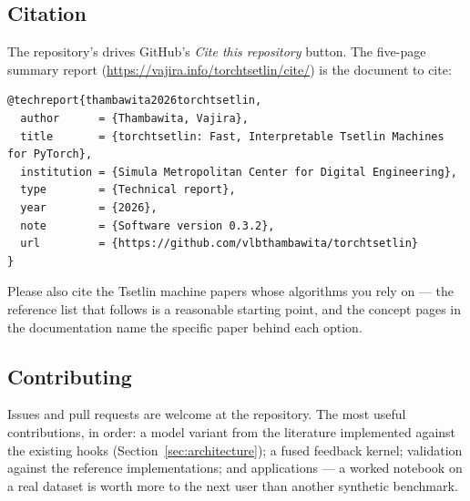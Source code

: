 \subsection{Citation}

The repository's  drives GitHub's \emph{Cite this repository} button. The
five-page summary report (\url{https://vajira.info/torchtsetlin/cite/}) is the document to cite:

\begin{lstlisting}[style=ttshell,basicstyle=\ttfamily\scriptsize\color{ttink}]
@techreport{thambawita2026torchtsetlin,
  author      = {Thambawita, Vajira},
  title       = {torchtsetlin: Fast, Interpretable Tsetlin Machines for PyTorch},
  institution = {Simula Metropolitan Center for Digital Engineering},
  type        = {Technical report},
  year        = {2026},
  note        = {Software version 0.3.2},
  url         = {https://github.com/vlbthambawita/torchtsetlin}
}
\end{lstlisting}

Please also cite the Tsetlin machine papers whose algorithms you rely on --- the reference
list that follows is a reasonable starting point, and the concept pages in the documentation
name the specific paper behind each option.

\subsection{Contributing}

Issues and pull requests are welcome at the repository. The most useful contributions, in
order: a model variant from the literature implemented against the existing hooks
(Section~\ref{sec:architecture}); a fused feedback kernel; validation against the reference
implementations; and applications --- a worked notebook on a real dataset is worth more to the
next user than another synthetic benchmark.
